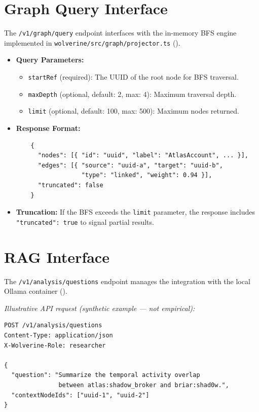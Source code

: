 \section{Graph Query Interface}
\label{app-sec:api-graph}

The \texttt{/v1/graph/query} endpoint interfaces with the in-memory BFS engine implemented in \texttt{wolverine/src/graph/projector.ts} ().

\begin{itemize}
    \item \textbf{Query Parameters:}
    \begin{itemize}
        \item \texttt{startRef} (required): The UUID of the root node for BFS traversal.
        \item \texttt{maxDepth} (optional, default: 2, max: 4): Maximum traversal depth.
        \item \texttt{limit} (optional, default: 100, max: 500): Maximum nodes returned.
    \end{itemize}
    \item \textbf{Response Format:}
    \begin{verbatim}
    {
      "nodes": [{ "id": "uuid", "label": "AtlasAccount", ... }],
      "edges": [{ "source": "uuid-a", "target": "uuid-b",
                  "type": "linked", "weight": 0.94 }],
      "truncated": false
    }
    \end{verbatim}
    \item \textbf{Truncation:} If the BFS exceeds the \texttt{limit} parameter, the response includes \texttt{"truncated": true} to signal partial results.
\end{itemize}

\section{RAG Interface}
\label{app-sec:api-rag}

The \texttt{/v1/analysis/questions} endpoint manages the integration with the local Ollama container ().

\textit{Illustrative API request (synthetic example --- not empirical):}
\begin{verbatim}
POST /v1/analysis/questions
Content-Type: application/json
X-Wolverine-Role: researcher

{
  "question": "Summarize the temporal activity overlap
               between atlas:shadow_broker and briar:shad0w.",
  "contextNodeIds": ["uuid-1", "uuid-2"]
}
\end{verbatim}

